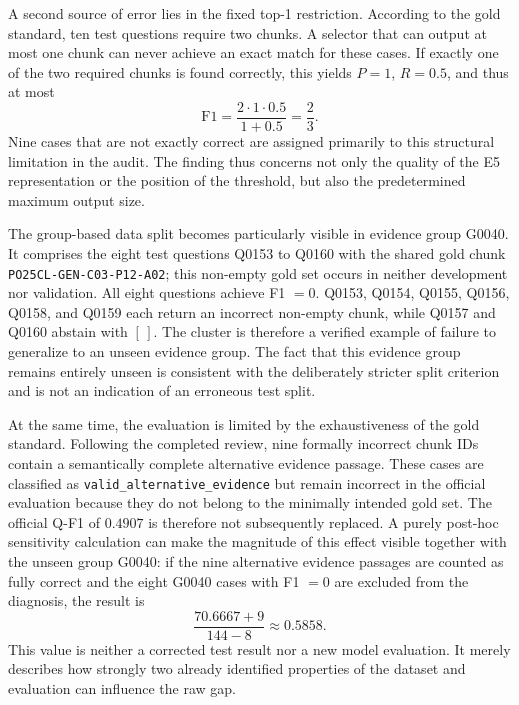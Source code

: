 \documentclass[11pt]{article}
\begin{document}
A second source of error lies in the fixed top-1 restriction. According to the gold standard, ten test questions require two chunks. A selector that can output at most one chunk can never achieve an exact match for these cases. If exactly one of the two required chunks is found correctly, this yields $P=1$, $R=0.5$, and thus at most
\begin{equation}
\mathrm{F1}=\frac{2\cdot1\cdot0.5}{1+0.5}=\frac{2}{3}.
\end{equation}
Nine cases that are not exactly correct are assigned primarily to this structural limitation in the audit. The finding thus concerns not only the quality of the E5 representation or the position of the threshold, but also the predetermined maximum output size.

The group-based data split becomes particularly visible in evidence group G0040. It comprises the eight test questions Q0153 to Q0160 with the shared gold chunk \texttt{PO25CL-GEN-C03-P12-A02}; this non-empty gold set occurs in neither development nor validation. All eight questions achieve F1 $=0$. Q0153, Q0154, Q0155, Q0156, Q0158, and Q0159 each return an incorrect non-empty chunk, while Q0157 and Q0160 abstain with $[\,]$. The cluster is therefore a verified example of failure to generalize to an unseen evidence group. The fact that this evidence group remains entirely unseen is consistent with the deliberately stricter split criterion and is not an indication of an erroneous test split.

At the same time, the evaluation is limited by the exhaustiveness of the gold standard. Following the completed review, nine formally incorrect chunk IDs contain a semantically complete alternative evidence passage. These cases are classified as \texttt{valid\_alternative\_evidence} but remain incorrect in the official evaluation because they do not belong to the minimally intended gold set. The official Q-F1 of $0.4907$ is therefore not subsequently replaced. A purely post-hoc sensitivity calculation can make the magnitude of this effect visible together with the unseen group G0040: if the nine alternative evidence passages are counted as fully correct and the eight G0040 cases with F1 $=0$ are excluded from the diagnosis, the result is
\begin{equation}
\frac{70.6667+9}{144-8}\approx0.5858.
\end{equation}
This value is neither a corrected test result nor a new model evaluation. It merely describes how strongly two already identified properties of the dataset and evaluation can influence the raw gap.
\end{document}

